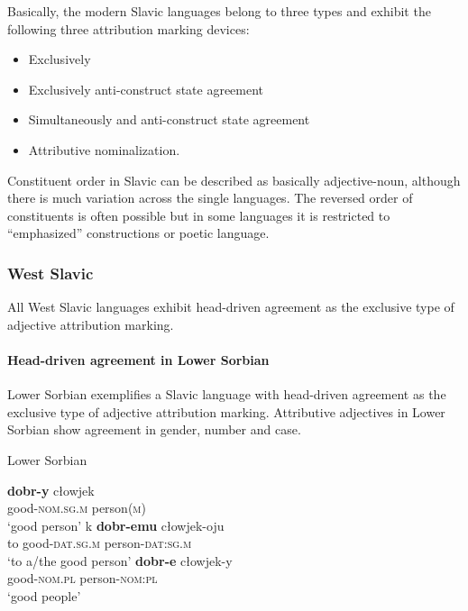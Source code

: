 Basically, the modern Slavic languages belong to three types and exhibit the following three attribution marking devices:
\begin{itemize}
\item Exclusively 
\item Exclusively anti\hyp{}construct state agreement
\item Simultaneously  and anti\hyp{}construct state agreement
\item Attributive nominalization.
\end{itemize}
Constituent order in Slavic can be described as basically adjective-noun, although there is much variation across the single languages. The reversed order of constituents is often possible but in some languages it is restricted to “emphasized” constructions or poetic language. 

\subsubsection{West Slavic}
All West Slavic languages exhibit head\hyp{}driven agreement as the exclusive type of adjective attribution marking.

\paragraph*{Head\hyp{}driven agreement in Lower Sorbian}
Lower Sorbian exemplifies a Slavic language with head\hyp{}driven agreement as the exclusive type of adjective attribution marking. Attributive adjectives in Lower Sorbian show agreement in gender, number and case. 
\begin{exe}
\ex \rm{Lower Sorbian \citep{janas1976}}
\begin{xlist}
\ex
\gll	\textbf{dobr-y} cłowjek\\
	good-\textsc{nom.sg.m} person(\textsc{m})\\
\glt	‘good person’
\ex
\gll	k \textbf{dobr-emu} cłowjek-oju\\
	to good-\textsc{dat.sg.m} person-\textsc{dat:sg.m}\\
\glt	‘to a/the good person’
\ex
\gll	\textbf{dobr-e} cłowjek-y\\
	good-\textsc{nom.pl} person-\textsc{nom:pl}\\
\glt	‘good people’
\end{xlist}
\end{exe}

